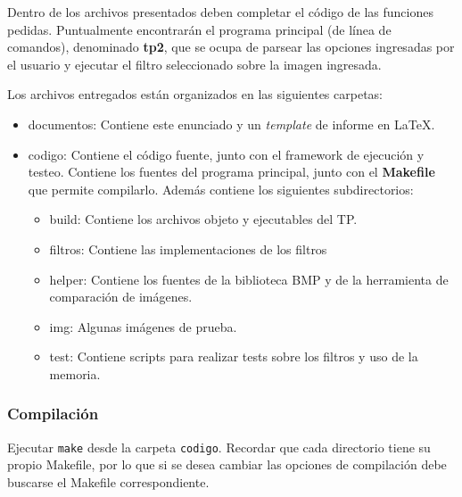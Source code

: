 \documentclass[a4paper, 12pt]{article}
\newcommand{\code}[1]{{\sffamily #1}\xspace}
\begin{document}
\vspace*{0.3cm}
Dentro de los archivos presentados deben completar el código de las funciones
pedidas. Puntualmente encontrarán el programa principal (de línea de
comandos), denominado \textbf{tp2}, que se ocupa de parsear las opciones
ingresadas por el usuario y ejecutar el filtro seleccionado sobre la imagen
ingresada.

\vspace*{0.3cm}
\noindent Los archivos entregados están organizados en las siguientes carpetas:

\begin{itemize}
    \itemsep0em
    \item
        \code{documentos}: Contiene este enunciado y un \emph{template}
        de informe en \LaTeX.

	\item
		\code{codigo}: Contiene el código fuente, junto con el framework
		de ejecución y testeo.
		Contiene los fuentes del programa principal,
    		junto con el \textbf{Makefile} que permite compilarlo.
		Además contiene los siguientes subdirectorios:
		\begin{itemize}
		\item
			\code{build}: Contiene los archivos objeto y ejecutables
			del TP.

		\item
			\code{filtros}: Contiene las implementaciones de los filtros

		\item
			\code{helper}: Contiene los fuentes de la biblioteca BMP y
			de la herramienta de comparación de imágenes.

		\item
			\code{img}: Algunas imágenes de prueba.

    		\item
			\code{test}: Contiene scripts para realizar tests sobre los
	        filtros y uso de la memoria.
	\end{itemize}
\end{itemize}

\subsubsection*{Compilación}

Ejecutar \texttt{make} desde la carpeta \texttt{codigo}.
Recordar que cada directorio tiene su propio \code{Makefile},
por lo que si se desea cambiar las opciones de compilación
debe buscarse el \code{Makefile} correspondiente.
\end{document}
